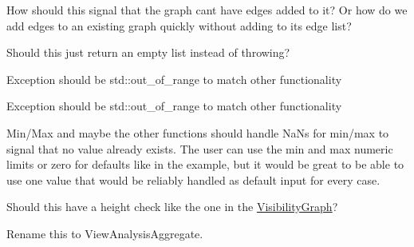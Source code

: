 \begin{DoxyRefList}
%
How should this signal that the graph can\textquotesingle{}t have edges added to it? Or how do we add edges to an existing graph quickly without adding to its edge list? 
\item[Member \mbox{\hyperlink{a01551_a7c2ea4fda7d310b500456ff14527bab9}{HF\+::Spatial\+Structures\+::Graph\+::operator\mbox{[}\mbox{]}}} (const \mbox{\hyperlink{a02071}{Node}} \&n) const]\label{a00452__todo000026}%
%
Should this just return an empty list instead of throwing?  
\item[Member \mbox{\hyperlink{a02071_a556efc898ddc67b64fff560d0c7b5a0a}{HF\+::Spatial\+Structures\+::Node\+::operator\mbox{[}\mbox{]}}} (int i)]\label{a00452__todo000029}%
%
Exception should be std\+::out\+\_\+of\+\_\+range to match other functionality 
\item[Member \mbox{\hyperlink{a02071_ae3e88bd4eecfdbd93431953ed07b8a7b}{HF\+::Spatial\+Structures\+::Node\+::operator\mbox{[}\mbox{]}}} (int i) const]\label{a00452__todo000030}%
%
Exception should be std\+::out\+\_\+of\+\_\+range to match other functionality 
\item[Member \mbox{\hyperlink{a00466_a38c197b654c753cb656ab60e88d65120}{HF\+::View\+Analysis\+::Aggregate}} (float \&out\+\_\+total, float new\+\_\+value, const AGGREGATE\+\_\+\+TYPE agg\+\_\+type, int count=0)]\label{a00452__todo000003}%
%
Min/\+Max and maybe the other functions should handle Na\+Ns for min/max to signal that no value already exists. The user can use the min and max numeric limits or zero for defaults like in the example, but it would be great to be able to use one value that would be reliably handled as default input for every case.  
\item[Member \mbox{\hyperlink{a00459_ga78f77d24531d0fa55c9b60d7ec1bf32a}{HF\+::View\+Analysis\+::Spherical\+Rayshoot\+With\+Any\+RTFor\+Distance}} (RT \&ray\+\_\+tracer, const std\+::vector$<$ N $>$ \&Nodes, int num\+\_\+rays, float upward\+\_\+limit=50.\+0f, float downward\+\_\+limit=70.\+0f, float height=1.\+7f, const AGGREGATE\+\_\+\+TYPE aggregation=\mbox{\hyperlink{a00466_a1fcaa17d2a8df8896a3b0447973bd07ba6970bdc2201030b9c03fbdcf3973858a}{AGGREGATE\+\_\+\+TYPE\+::\+SUM}})]\label{a00452__todo000005}%
%
Should this have a height check like the one in the \mbox{\hyperlink{a00467}{Visibility\+Graph}}?

\label{a00452__todo000006}%
%
Rename this to View\+Analysis\+Aggregate.


\end{DoxyRefList}
